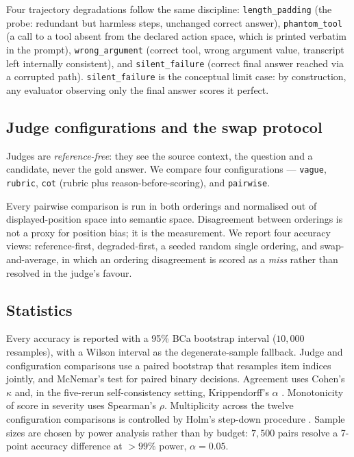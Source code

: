 \documentclass[10pt,letterpaper]{article}
\begin{document}
Four trajectory degradations follow the same discipline:
\texttt{length\_padding} (the probe: redundant but harmless steps, unchanged correct answer),
\texttt{phantom\_tool} (a call to a tool absent from the declared action space, which is printed
verbatim in the prompt), \texttt{wrong\_argument} (correct tool, wrong argument value, transcript
left internally consistent), and \texttt{silent\_failure} (correct final answer reached via a
corrupted path). \texttt{silent\_failure} is the conceptual limit case: by construction, any
evaluator observing only the final answer scores it perfect.

\subsection{Judge configurations and the swap protocol}

Judges are \emph{reference-free}: they see the source context, the question and a candidate,
never the gold answer. We compare four configurations --- \texttt{vague}, \texttt{rubric},
\texttt{cot} (rubric plus reason-before-scoring), and \texttt{pairwise}.

Every pairwise comparison is run in both orderings and normalised out of displayed-position space
into semantic space. Disagreement between orderings is not a proxy for position bias; it is the
measurement. We report four accuracy views: reference-first, degraded-first, a seeded random
single ordering, and swap-and-average, in which an ordering disagreement is scored as a
\emph{miss} rather than resolved in the judge's favour.

\subsection{Statistics}

Every accuracy is reported with a 95\% BCa bootstrap interval \cite{efron1987better}
($10{,}000$ resamples), with a Wilson interval as the degenerate-sample fallback. Judge and
configuration comparisons use a paired bootstrap that resamples item indices jointly, and
McNemar's test \cite{mcnemar1947note} for paired binary decisions. Agreement uses Cohen's $\kappa$
and, in the five-rerun self-consistency setting, Krippendorff's $\alpha$
\cite{krippendorff2018content}. Monotonicity of score in severity uses Spearman's $\rho$.
Multiplicity across the twelve configuration comparisons is controlled by Holm's step-down
procedure \cite{holm1979simple}. Sample sizes are chosen by power analysis rather than by budget:
$7{,}500$ pairs resolve a 7-point accuracy difference at $>99\%$ power, $\alpha = 0.05$.
\end{document}
